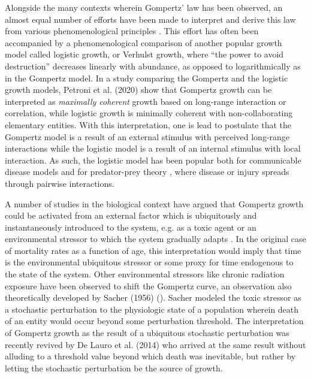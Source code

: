 \documentclass{article}
\begin{document}
Alongside the many contexts wherein Gompertz' law has been observed, an almost equal number of efforts have been made to interpret and derive this law from various phenomenological principles \cite{bajzer1997mathematical}. This effort has often been accompanied by a phenomenological comparison of another popular growth model called logistic growth, or Verhulst growth, where ``the power to avoid destruction'' decreases linearly with abundance, as opposed to logarithmically as in the Gompertz model. In a study comparing the Gompertz and the logistic growth models, Petroni et al. (2020) \cite{petroni2020logistic} show that Gompertz growth can be interpreted as \textit{maximally coherent} growth based on long-range interaction or correlation, while logistic growth is minimally coherent with non-collaborating elementary entities. With this interpretation, one is lead to postulate that the Gompertz model is a result of an external stimulus with perceived long-range interactions while the logistic model is a result of an internal stimulus with local interaction. As such, the logistic model has been popular both for communicable disease models \cite{harko2014exact,kroger2020analytical,schlickeiser2021analytical,heng2020approximately} and for predator-prey theory \cite{berryman1992orgins}, where disease or injury spreads through pairwise interactions. 

A number of studies in the biological context have argued that Gompertz growth could be activated from an external factor which is ubiquitously and instantaneously introduced to the system, e.g. as a toxic agent or an environmental stressor to which the system gradually adapts \cite{neafsey1988gompertz,neafsey1989gompertz,thompson1990biphasic}. In the original case of mortality rates as a function of age, this interpretation would imply that time is the environmental ubiquitous stressor or some proxy for time endogenous to the state of the system. Other environmental stressors like chronic radiation exposure have been observed to shift the Gompertz curve, an observation also theoretically developed by Sacher (1956) (\cite{sacher1956statistical}). Sacher modeled the toxic stressor as a stochastic perturbation to the physiologic state of a population wherein death of an entity would occur beyond some perturbation threshold. The interpretation of Gompertz growth as the result of a ubiquitous stochastic perturbation was recently revived by De Lauro et al. (2014) \cite{de2014stochastic} who arrived at the same result without alluding to a threshold value beyond which death was inevitable, but rather by letting the stochastic perturbation be the source of growth.
\end{document}
